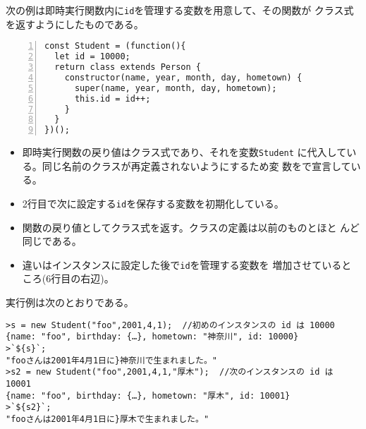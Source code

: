 \begin{Exec}\upshape
次の例は即時実行関数内に\texttt{id}を管理する変数を用意して、その関数が
 クラス式を返すようにしたものである。
\begin{Verbatim}[numbers=left]
const Student = (function(){
  let id = 10000;
  return class extends Person {
    constructor(name, year, month, day, hometown) {
      super(name, year, month, day, hometown);
      this.id = id++;
    }
  }
})();
\end{Verbatim}
 \begin{itemize}
  \item 即時実行関数の戻り値はクラス式であり、それを変数\texttt{Student}
        に代入している。同じ名前のクラスが再定義されないようにするため変
        数をで宣言している。
  \item 2行目で次に設定する\texttt{id}を保存する変数を初期化している。
  \item 関数の戻り値としてクラス式を返す。クラスの定義は以前のものとほと
        んど同じである。
  \item 違いはインスタンスに設定した後で\texttt{id}を管理する変数を
        増加させているところ(6行目の右辺)。
 \end{itemize}
 実行例は次のとおりである。
\begin{Verbatim}
>s = new Student("foo",2001,4,1);  //初めのインスタンスの id は 10000
{name: "foo", birthday: {…}, hometown: "神奈川", id: 10000}
>`${s}`;
"fooさんは2001年4月1日に}神奈川で生まれました。"
>s2 = new Student("foo",2001,4,1,"厚木");  //次のインスタンスの id は 10001
{name: "foo", birthday: {…}, hometown: "厚木", id: 10001}
>`${s2}`;
"fooさんは2001年4月1日に}厚木で生まれました。"
\end{Verbatim}
\end{Exec}
